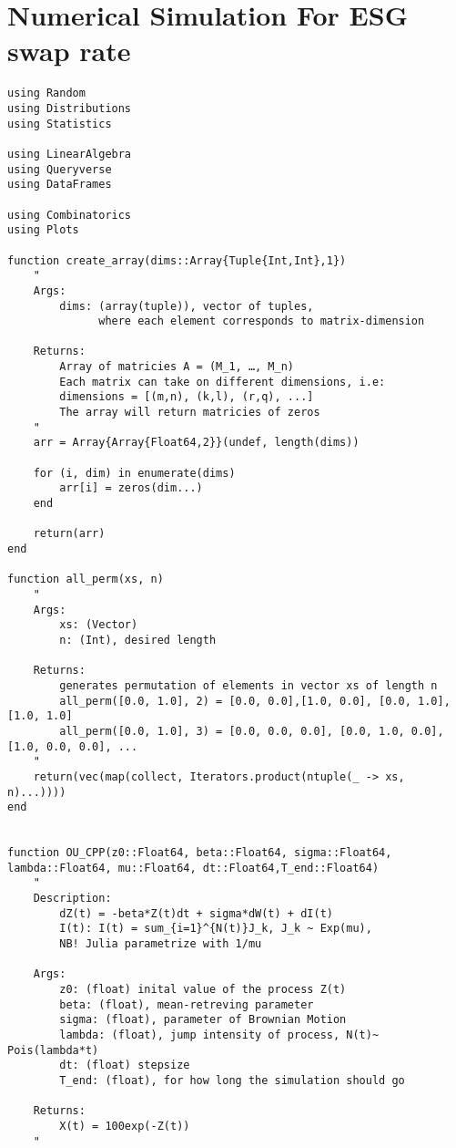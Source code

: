 \newpage 

\section{Numerical Simulation For ESG swap rate}

\begin{verbatim}
using Random 
using Distributions
using Statistics

using LinearAlgebra
using Queryverse
using DataFrames

using Combinatorics
using Plots

function create_array(dims::Array{Tuple{Int,Int},1})
    "
    Args: 
        dims: (array(tuple)), vector of tuples, 
              where each element corresponds to matrix-dimension
    
    Returns:
        Array of matricies A = (M_1, …, M_n)
        Each matrix can take on different dimensions, i.e:
        dimensions = [(m,n), (k,l), (r,q), ...] 
        The array will return matricies of zeros    
    "
    arr = Array{Array{Float64,2}}(undef, length(dims))

    for (i, dim) in enumerate(dims)
        arr[i] = zeros(dim...)
    end

    return(arr)
end

function all_perm(xs, n)
    " 
    Args: 
        xs: (Vector)
        n: (Int), desired length
    
    Returns:
        generates permutation of elements in vector xs of length n
        all_perm([0.0, 1.0], 2) = [0.0, 0.0],[1.0, 0.0], [0.0, 1.0], [1.0, 1.0]
        all_perm([0.0, 1.0], 3) = [0.0, 0.0, 0.0], [0.0, 1.0, 0.0], [1.0, 0.0, 0.0], ...
    "
    return(vec(map(collect, Iterators.product(ntuple(_ -> xs, n)...))))
end 


function OU_CPP(z0::Float64, beta::Float64, sigma::Float64, lambda::Float64, mu::Float64, dt::Float64,T_end::Float64)
    " 
    Description:
        dZ(t) = -beta*Z(t)dt + sigma*dW(t) + dI(t)
        I(t): I(t) = sum_{i=1}^{N(t)}J_k, J_k ~ Exp(mu), 
        NB! Julia parametrize with 1/mu

    Args:    
        z0: (float) inital value of the process Z(t)
        beta: (float), mean-retreving parameter
        sigma: (float), parameter of Brownian Motion
        lambda: (float), jump intensity of process, N(t)~ Pois(lambda*t) 
        dt: (float) stepsize 
        T_end: (float), for how long the simulation should go
     
    Returns: 
        X(t) = 100exp(-Z(t))
    "


\end{verbatim}

